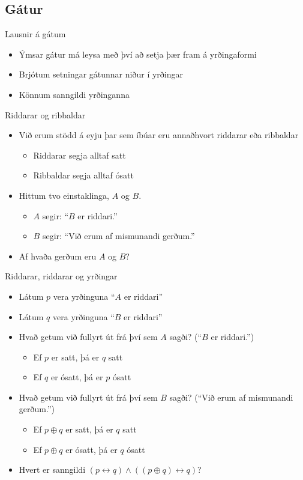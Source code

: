 \documentclass[handout]{beamer}
\begin{document}
\subsection{Gátur}

\begin{frame}{Lausnir á gátum}
\begin{itemize}
 \item Ýmsar gátur má leysa með því að setja þær fram á yrðingaformi
 \item Brjótum setningar gátunnar niður í yrðingar
 \item Könnum sanngildi yrðinganna
\end{itemize}
\end{frame}

\begin{frame}{Riddarar og ribbaldar}
\begin{itemize}
 \item Við erum stödd á eyju þar sem íbúar eru annaðhvort riddarar eða ribbaldar\pause
 \begin{itemize}
  \item Riddarar segja alltaf satt
  \item Ribbaldar segja alltaf ósatt
 \end{itemize}
 \item Hittum tvo einstaklinga, $A$ og $B$. 
 \begin{itemize}
  \item $A$ segir: ``$B$ er riddari.''
  \item $B$ segir: ``Við erum af mismunandi gerðum.''
 \end{itemize}
 \item Af hvaða gerðum eru $A$ og $B$?
\end{itemize}
\end{frame}

\begin{frame}{Riddarar, riddarar og yrðingar}
\begin{itemize}
 \item Látum $p$ vera yrðinguna ``$A$ er riddari''
 \item Látum $q$ vera yrðinguna ``$B$ er riddari''
 \item Hvað getum við fullyrt út frá því sem $A$ sagði? (``$B$ er riddari.'') \pause
 \begin{itemize}
  \item Ef $p$ er satt, þá er $q$ satt
  \item Ef $q$ er ósatt, þá er $p$ ósatt
 \end{itemize}
 \item Hvað getum við fullyrt út frá því sem $B$ sagði? (``Við erum af mismunandi gerðum.'') \pause
 \begin{itemize}
  \item Ef $p \oplus q$ er satt, þá er $q$ satt
  \item Ef $p \oplus q$ er ósatt, þá er $q$ ósatt
 \end{itemize}
 \item Hvert er sanngildi $(p \leftrightarrow q) \land ((p \oplus q) \leftrightarrow q)$?
\end{itemize}
\end{frame}
\end{document}
